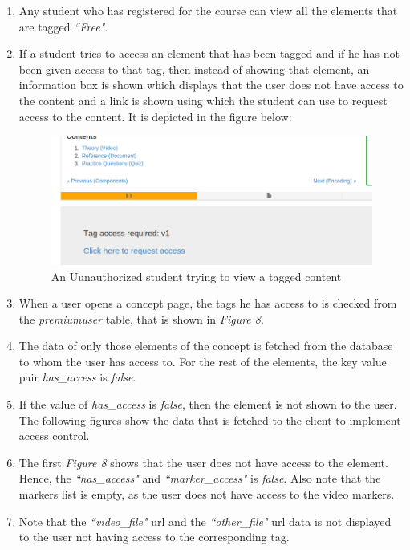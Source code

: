 \begin{enumerate}
	\item Any student who has registered for the course can view all the elements that are tagged \textit{``Free"}.
	
	\item If a student tries to access an element that has been tagged and if he has not been given access to that tag, then instead of showing that element, an information box is shown which displays that the user does not have access to the content and a link is shown using which the student can use to request access to the content. It is depicted in the figure below:
	\begin{figure}[h]
		\centering
		\includegraphics[width=0.8\linewidth]{./media/sAccessNot}
		\caption{An Uunauthorized student trying to view a tagged content}
		\label{fig:sAccessNot}
	\end{figure}
	
	\item When a user opens a concept page, the tags he has access to is checked from the \textit{premiumuser} table, that is shown in \textit{Figure 8}.

	\item The data of only those elements of the concept is fetched from the database to whom the user has access to. For the rest of the elements, the key value pair \textit{has\_access} is \textit{false}.
	
	\item If the value of \textit{has\_access} is \textit{false}, then the element is not shown to the user. The following figures show the data that is fetched to the client to implement access control.
	
	\item The first \textit{Figure 8} shows that the user does not have access to the element. Hence, the \textit{``has\_access"} and \textit{``marker\_access"} is \textit{false}. Also note that the markers list is empty, as the user does not have access to the video markers.
	
	\item Note that the \textit{``video\_file"} url and the \textit{``other\_file"} url data is not displayed to the user not having access to the corresponding tag.
	

\end{enumerate}
